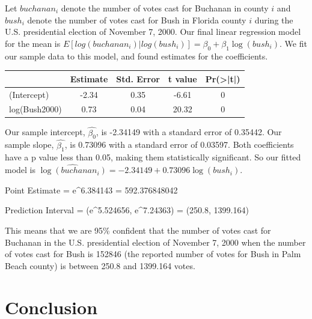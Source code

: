 \documentclass[
  letterpaper,
  DIV=11,
  numbers=noendperiod]{scrartcl}
\begin{document}
Let \(buchanan_i\) denote the number of votes cast for Buchanan in
county \(i\) and \(bush_i\) denote the number of votes cast for Bush in
Florida county \(i\) during the U.S. presidential election of November
7, 2000. Our final linear regression model for the mean is
\(E[log(buchanan_i) | log(bush_i)] = \beta_0 + \beta_1\log(bush_i).\) We
fit our sample data to this model, and found estimates for the
coefficients.

\begin{table}[H]
\centering
\begin{tabular}[t]{lcccc}
\toprule
  & Estimate & Std. Error & t value & Pr(>|t|)\\
\midrule
(Intercept) & -2.34 & 0.35 & -6.61 & 0\\
log(Bush2000) & 0.73 & 0.04 & 20.32 & 0\\
\bottomrule
\end{tabular}
\end{table}

Our sample intercept, \(\hat{\beta_0}\), is -2.34149 with a standard
error of 0.35442. Our sample slope, \(\hat{\beta_1}\), is 0.73096 with a
standard error of 0.03597. Both coefficients have a p value less than
0.05, making them statistically significant. So our fitted model is
\(\widehat{\log(buchanan_i)} = -2.34149 + 0.73096\log(bush_i).\)

Point Estimate = e\^{}6.384143 = 592.376848042

Prediction Interval = (e\^{}5.524656, e\^{}7.24363) = (250.8, 1399.164)

This means that we are 95\% confident that the number of votes cast for
Buchanan in the U.S. presidential election of November 7, 2000 when the
number of votes cast for Bush is 152846 (the reported number of votes
for Bush in Palm Beach county) is between 250.8 and 1399.164 votes.

\hypertarget{conclusion}{%
\section{Conclusion}\label{conclusion}}
\end{document}
